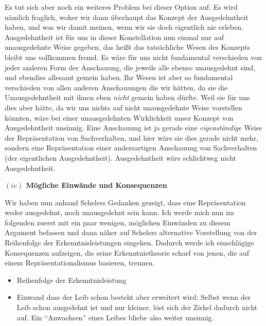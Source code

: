 \documentclass[a4paper, 12pt]{article}
\begin{document}
\begin{onehalfspace}
Es tut sich aber noch ein weiteres Problem bei dieser Option auf. Es wird nämlich fraglich, woher wir dann überhaupt das Konzept der Ausgedehntheit haben, und was wir damit meinen, wenn wir sie doch eigentlich nie erleben. Ausgedehntheit ist für uns in dieser Konstellation nun einmal nur auf unausgedehnte Weise gegeben, das heißt das tatsächliche Wesen des Konzepts bleibt uns vollkommen fremd. Es wäre für uns nicht fundamental verschieden von jeder anderen Form der Anschauung, die jeweils alle ebenso unausgedehnt sind, und ebendies allesamt gemein haben. Ihr Wesen ist aber so fundamental verschieden von allen anderen Anschauungen die wir hätten, da sie die Unausgedehntheit mit ihnen eben \emph{nicht} gemein haben dürfte. Weil sie für uns dies aber hätte, da wir uns nichts auf nicht unausgedehnte Weise vorstellen könnten, wäre bei einer unausgedehnten Wirklichkeit unser Konzept von Ausgedehntheit unsinnig. Eine Anschauung ist ja gerade eine \emph{eigenständige} Weise der Repräsentation von Sachverhalten, und hier wäre sie dies gerade nicht mehr, sondern eine Repräsentation einer andersartigen Anschauung von Sachverhalten (der eigentlichen Ausgedehntheit). Ausgedehntheit wäre schlichtweg nicht Ausgedehntheit. 




\vspace{5mm}
\noindent\textbf{$(iv)$ Mögliche Einwände und Konsequenzen}


\noindent Wir haben nun anhand Schelers Gedanken gezeigt, dass eine Repräsentation weder ausgedehnt, noch unausgedehnt sein kann. Ich werde mich nun im folgenden zuerst mit ein paar wenigen, möglichen Einwänden zu diesem Argument befassen und dann näher auf Schelers alternative Vorstellung von der Reihenfolge der Erkenntnisleistungen eingehen. Dadurch werde ich einschlägige Konsequenzen aufzeigen, die seine Erkenntnistheorie scharf von jenen, die auf einem Repräsentationalismus basieren, trennen.


\begin{itemize}
  \item Reihenfolge der Erkenntnisleistung
  \item Einwand dass der Leib schon besteht aber erweitert wird: Selbst wenn der Leib schon ausgedehnt ist und nur kleiner, löst sich der Zirkel dadurch nicht auf. Ein "`Anwachsen"' eines Leibes bliebe also weiter unsinnig. 
\end{itemize}


\end{onehalfspace}
\end{document}
